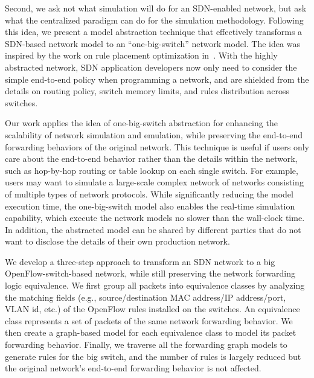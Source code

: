 \label{OBS:Sec:Intro}

Second, we ask not what simulation will do for an SDN-enabled network, but ask what the centralized paradigm can do for the simulation methodology.
Following this idea, we present a model abstraction technique that effectively transforms
a SDN-based network model to an ``one-big-switch'' network model.
The idea was inspired by the work on rule placement optimization in~\cite{OneBigSwitchAbstraction}.
With the highly abstracted network, SDN application developers now only need to consider
the simple end-to-end policy when programming a network,
and are shielded from the details on routing policy, switch memory limits,
and rules distribution across switches.

Our work applies the idea of one-big-switch abstraction for enhancing the scalability
of network simulation and emulation, while preserving the end-to-end forwarding behaviors of the original network.
This technique is useful if users only care about the end-to-end behavior rather than
the details within the network, such as hop-by-hop routing or table lookup on each single switch.
For example, users may want to simulate a large-scale complex network of networks consisting of multiple types of network protocols.
While significantly reducing the model execution time, the one-big-switch model also enables the real-time simulation capability,
which execute the network models no slower than the wall-clock time.
In addition, the abstracted model can be shared by different parties that do not want to disclose the details
of their own production network.

We develop a three-step approach to transform an SDN network to a big OpenFlow-switch-based network,
while still preserving the network forwarding logic equivalence.
We first group all packets into equivalence classes by analyzing the matching fields
(e.g., source/destination MAC address/IP address/port, VLAN id, etc.)
of the OpenFlow rules installed on the switches.
An equivalence class represents a set of packets of the same network forwarding behavior.
We then create a graph-based model for each equivalence class to model its packet forwarding behavior.
Finally, we traverse all the forwarding graph models to generate rules for the big switch,
and the number of rules is largely reduced but the original network's end-to-end forwarding behavior is not affected.

